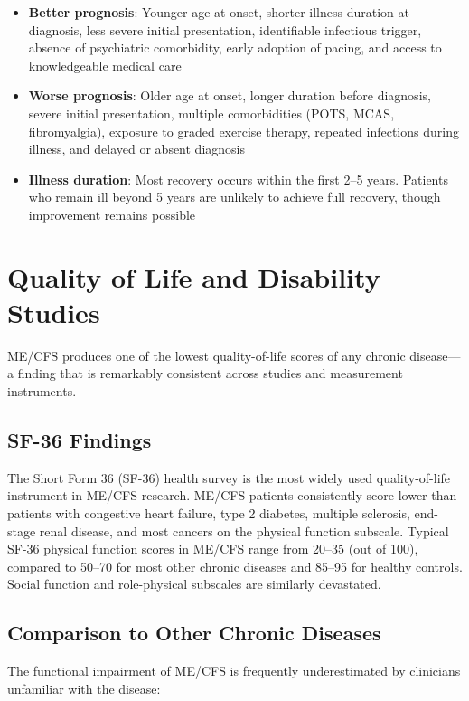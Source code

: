 \begin{itemize}
    \item \textbf{Better prognosis}: Younger age at onset, shorter illness duration at diagnosis, less severe initial presentation, identifiable infectious trigger, absence of psychiatric comorbidity, early adoption of pacing, and access to knowledgeable medical care
    \item \textbf{Worse prognosis}: Older age at onset, longer duration before diagnosis, severe initial presentation, multiple comorbidities (POTS, MCAS, fibromyalgia), exposure to graded exercise therapy, repeated infections during illness, and delayed or absent diagnosis
    \item \textbf{Illness duration}: Most recovery occurs within the first 2--5 years. Patients who remain ill beyond 5 years are unlikely to achieve full recovery, though improvement remains possible
\end{itemize}

\section{Quality of Life and Disability Studies}
\label{sec:quality-of-life-studies}

ME/CFS produces one of the lowest quality-of-life scores of any chronic disease---a finding that is remarkably consistent across studies and measurement instruments.

\subsection{SF-36 Findings}

The Short Form 36 (SF-36) health survey is the most widely used quality-of-life instrument in ME/CFS research. ME/CFS patients consistently score lower than patients with congestive heart failure, type 2 diabetes, multiple sclerosis, end-stage renal disease, and most cancers on the physical function subscale. Typical SF-36 physical function scores in ME/CFS range from 20--35 (out of 100), compared to 50--70 for most other chronic diseases and 85--95 for healthy controls. Social function and role-physical subscales are similarly devastated.

\subsection{Comparison to Other Chronic Diseases}

The functional impairment of ME/CFS is frequently underestimated by clinicians unfamiliar with the disease:

